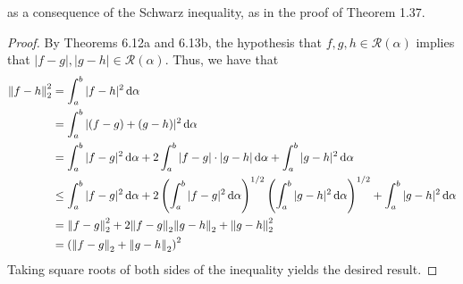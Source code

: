 \documentclass[../psets.tex]{subfiles}
\begin{document}
\begin{enumerate}[label={\textbf{\arabic*.}}]
\begin{equation*}
    \end{equation*}
    as a consequence of the Schwarz inequality, as in the proof of Theorem 1.37.
    \begin{proof}
        By Theorems 6.12a and 6.13b, the hypothesis that $f,g,h\in\mathscr{R}(\alpha)$ implies that $|f-g|,|g-h|\in\mathscr{R}(\alpha)$. Thus, we have that
        \begin{align*}
            \norm{f-h}_2^2 &= \int_a^b|f-h|^2\dd{\alpha}\\
            &= \int_a^b|(f-g)+(g-h)|^2\dd{\alpha}\\
            &= \int_a^b|f-g|^2\dd{\alpha}+2\int_a^b|f-g|\cdot|g-h|\dd{\alpha}+\int_a^b|g-h|^2\dd{\alpha}\\
            &\leq \int_a^b|f-g|^2\dd{\alpha}+2\left( \int_a^b|f-g|^2\dd{\alpha} \right)^{1/2}\left( \int_a^b|g-h|^2\dd{\alpha} \right)^{1/2}+\int_a^b|g-h|^2\dd{\alpha}\\
            &= \norm{f-g}_2^2+2\norm{f-g}_2\norm{g-h}_2+\norm{g-h}_2^2\\
            &= \left( \norm{f-g}_2+\norm{g-h}_2 \right)^2
        \end{align*}
        Taking square roots of both sides of the inequality yields the desired result.
    \end{proof}
\end{enumerate}
\end{document}

